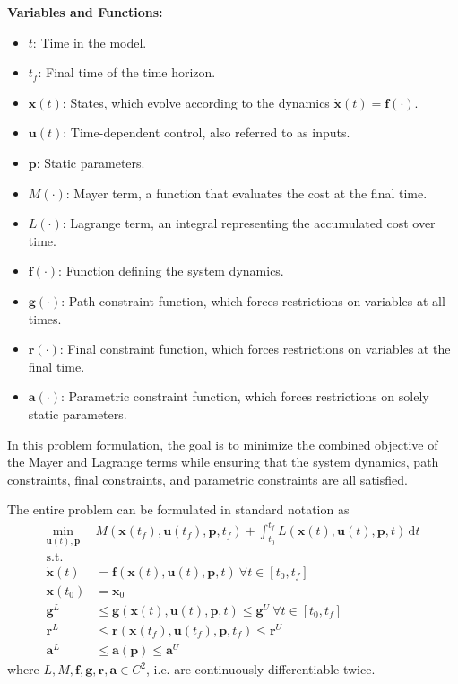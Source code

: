\documentclass[12pt]{article}
\renewcommand{\v}{\bm}
\begin{document}
\noindent
\textbf{Variables and Functions:}
\begin{itemize}
	\item $t$: Time in the model.
	\item $t_f$: Final time of the time horizon.
	\item $\v{x}(t)$: States, which evolve according to the dynamics $\dot{\v{x}}(t) = \v{f}(\cdot)$.
	\item $\v{u}(t)$: Time-dependent control, also referred to as inputs.
	\item $\v{p}$: Static parameters.
	\item $M(\cdot)$: Mayer term, a function that evaluates the cost at the final time.
	\item $L(\cdot)$: Lagrange term, an integral representing the accumulated cost over time.
	\item $\v{f}(\cdot)$: Function defining the system dynamics.
	\item $\v{g}(\cdot)$: Path constraint function, which forces restrictions on variables at all times.
	\item $\v{r}(\cdot)$: Final constraint function, which forces restrictions on variables at the final time.
	\item $\v{a}(\cdot)$: Parametric constraint function, which forces restrictions on solely static parameters.
\end{itemize}

In this problem formulation, the goal is to minimize the combined objective of the Mayer and Lagrange terms while ensuring that the system dynamics, path constraints, final constraints, and parametric constraints are all satisfied.

The entire problem can be formulated in standard notation as
\begin{align*}
	\min_{\v{u}(t), \v{p}} ~ & M(\v{x}(t_f), \v{u}(t_f),
	\v{p}, t_f) + \int_{t_0}^{t_f} L(\v{x}(t), \v{u}(t), \v{p}, t)
	\, \mathrm{d}t
	\\
	\text{s.t.}              &
	\\
	\dot{\v{x}}(t)           & = \v{f}(\v{x}(t), \v{u}(t), \v{p},
	t)\
	\forall t \in [t_0, t_f]
	\\
	\v{x}(t_0)               & = \v{x}_0
	\\
	\v{g}^{L}                & \leq \v{g}(\v{x}(t), \v{u}(t),
	\v{p}, t)
	\leq \v{g}^{U}\ \forall t \in [t_0, t_f]
	\\
	\v{r}^{L}                & \leq \v{r}(\v{x}(t_f), \v{u}(t_f),
	\v{p},
	t_f) \leq \v{r}^{U}
	\\
	\v{a}^{L}                & \leq \v{a}(\v{p}) \leq \v{a}^{U}
\end{align*}
where $L, M, \v{f}, \v{g}, \v{r}, \v{a} \in C^2$, i.e. are continuously differentiable twice.
\end{document}
